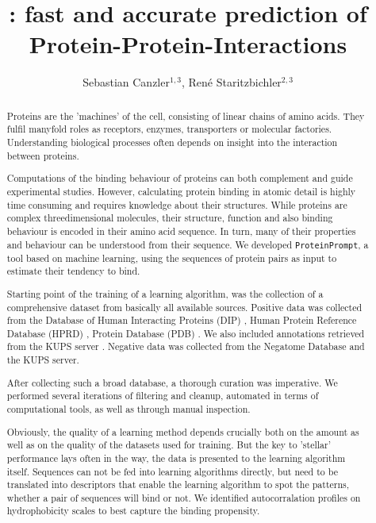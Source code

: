 \documentclass{article}
\title{\tool: fast and accurate prediction of Protein-Protein-Interactions}
\author{ Sebastian Canzler$^{1,3}$, Ren\'{e} Staritzbichler$^{2,3}$}
\newcommand{\tool}{\texttt{ProteinPrompt}}
\begin{document}
\maketitle





\begin{abstract}

 Proteins are the 'machines' of the cell, consisting of linear chains of amino acids.
They fulfil manyfold roles as receptors, enzymes, transporters or molecular factories.
Understanding biological processes often depends on insight into the interaction between proteins.

Computations of the binding behaviour of proteins can both complement and guide experimental studies.
However, calculating protein binding in atomic detail is highly time consuming and requires  knowledge about their structures.
While proteins are complex threedimensional molecules, their structure, function and also binding behaviour is encoded in their amino acid sequence.
In turn, many of their properties and behaviour can be understood from their sequence.
We developed \tool, a tool based on machine learning, using the sequences of protein pairs as input to estimate their tendency to bind.

Starting point of the training of a learning algorithm, was the collection of a comprehensive dataset from basically all available sources.
Positive data was collected from the
Database of Human Interacting Proteins (DIP)
\cite{Salwinski:2004},
Human Protein Reference Database (HPRD)
\cite{Keshava_Prasad:2009},
Protein  Database (PDB) \cite{Berman:2000}.
We also included annotations retrieved from the
KUPS server \cite{Chen:2011}.
Negative data was collected
from the Negatome Database \cite{Blohm:2014}  and the KUPS server.


After collecting such a broad database, a thorough curation was imperative.
We performed several iterations of filtering and cleanup, automated in terms of computational tools, as well as through manual inspection.

Obviously, the quality of a learning method depends crucially both on the amount as well as on the quality of the datasets used for training.
But the key to 'stellar' performance lays often in the way, the data is presented to the learning algorithm itself. 
Sequences can not be fed into learning algorithms directly, but need to be translated into descriptors that enable the learning algorithm to spot the patterns, whether a pair of sequences will bind or not.
We identified autocorralation profiles on hydrophobicity scales to best capture the binding propensity. 


\end{abstract}
\end{document}
